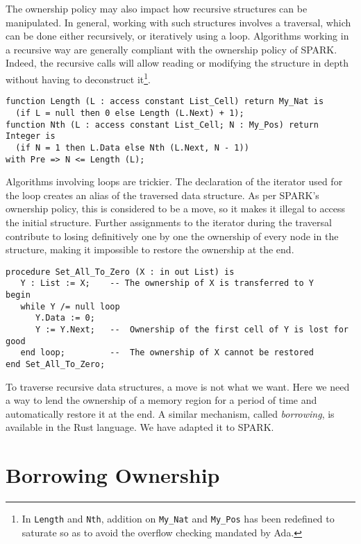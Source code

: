 \documentclass[runningheads]{llncs}
\begin{document}
The ownership policy may also impact how recursive structures can be manipulated. In general, working with such structures involves a traversal, which can be done either recursively, or iteratively using a loop. Algorithms working in a recursive way are generally compliant with the ownership policy of SPARK. Indeed, the recursive calls will allow reading or modifying the structure in depth without having to deconstruct it\footnote{In \texttt{Length} and \texttt{Nth}, addition on \texttt{My\_Nat} and \texttt{My\_Pos} has been redefined to saturate so as to avoid the overflow checking mandated by Ada.}.
\begin{lstlisting}
function Length (L : access constant List_Cell) return My_Nat is
  (if L = null then 0 else Length (L.Next) + 1);
function Nth (L : access constant List_Cell; N : My_Pos) return Integer is
  (if N = 1 then L.Data else Nth (L.Next, N - 1))
with Pre => N <= Length (L);
\end{lstlisting}
Algorithms involving loops are trickier. The declaration of the iterator used for the loop creates an alias of the traversed data structure. As per SPARK's ownership policy, this is considered to be a move, so it makes it illegal to access the initial structure. Further assignments to the iterator during the traversal contribute to losing definitively one by one the ownership of every node in the structure, making it impossible to restore the ownership at the end.
\begin{lstlisting}
procedure Set_All_To_Zero (X : in out List) is
   Y : List := X;    -- The ownership of X is transferred to Y
begin
   while Y /= null loop
      Y.Data := 0;
      Y := Y.Next;   --  Ownership of the first cell of Y is lost for good
   end loop;         --  The ownership of X cannot be restored
end Set_All_To_Zero;
\end{lstlisting}
To traverse recursive data structures, a move is not what we want. Here we need a way to lend the ownership of a memory region for a period of time and automatically restore it at the end. A similar mechanism, called \emph{borrowing}, is available in the Rust language. We have adapted it to SPARK.
\section{Borrowing Ownership}
\end{document}
